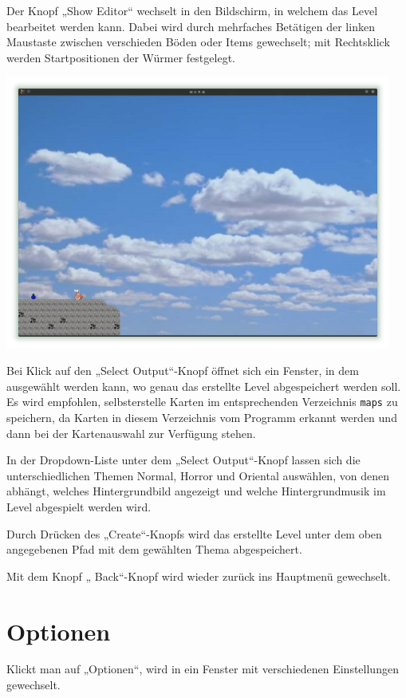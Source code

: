 \documentclass{scrreprt}
\begin{document}
Der Knopf „Show Editor“ wechselt in den Bildschirm, in welchem das Level bearbeitet werden kann. Dabei wird durch mehrfaches Betätigen der linken
Maustaste zwischen verschieden Böden oder Items gewechselt; mit Rechtsklick werden Startpositionen der Würmer festgelegt.

\includegraphics[height=9cm]{Screenshot4.jpg}

Bei Klick auf den „Select Output“-Knopf öffnet sich ein Fenster, in dem ausgewählt werden kann, wo genau das erstellte Level abgespeichert werden soll. Es wird empfohlen, selbsterstelle Karten im entsprechenden Verzeichnis \texttt{maps} zu speichern, da Karten in diesem Verzeichnis vom Programm erkannt werden und dann bei der Kartenauswahl zur Verfügung stehen.

In der Dropdown-Liste unter dem „Select Output“-Knopf lassen sich die unterschiedlichen Themen Normal, Horror und Oriental auswählen, von denen abhängt, welches Hintergrundbild angezeigt und welche Hintergrundmusik im Level abgespielt werden wird.

Durch Drücken des „Create“-Knopfs wird das erstellte Level unter dem oben angegebenen Pfad mit dem gewählten Thema abgespeichert.

Mit dem Knopf „ Back“-Knopf wird wieder zurück ins Hauptmenü gewechselt.

\chapter{Optionen}
Klickt man auf „Optionen“, wird in ein Fenster mit verschiedenen Einstellungen gewechselt.
\end{document}
